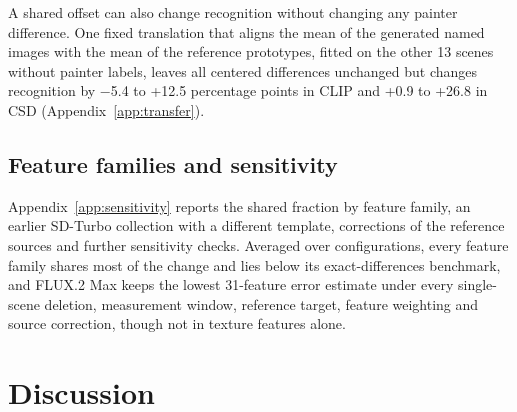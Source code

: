 \documentclass[10pt]{article}
\begin{document}
A shared offset can also change recognition without changing any painter difference. One fixed
translation that aligns the mean of the generated named images with the mean of the reference
prototypes, fitted on the other 13 scenes without painter labels, leaves all centered differences
unchanged but changes recognition by $-$5.4 to +12.5 percentage points in CLIP and +0.9 to +26.8 in
CSD (Appendix~\ref{app:transfer}).

\subsection{Feature families and sensitivity}\label{sec:sensitivity}

Appendix~\ref{app:sensitivity} reports the shared fraction by feature family, an earlier SD-Turbo
collection with a different template, corrections of the reference sources and further
sensitivity checks. Averaged over configurations, every feature family shares most of the change
and lies below its exact-differences benchmark, and FLUX.2 Max keeps the lowest 31-feature error
estimate under every single-scene deletion, measurement window, reference target, feature weighting
and source correction, though not in texture features alone.

\section{Discussion}\label{sec:discussion}
\end{document}
